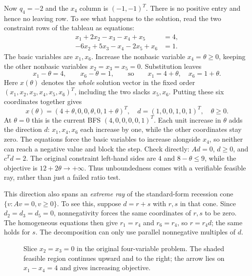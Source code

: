\documentclass[11pt,a4paper]{article}
\begin{document}
Now $q_4=-2$ and the $x_4$ column is $(-1,-1)^T$. There is no positive
entry and hence no leaving row. To see what happens to the solution, read
the two constraint rows of the tableau as equations:
\[
  \begin{aligned}
    x_1+2x_2-x_3-x_4+x_5&=4,\\
    -6x_2+5x_3-x_4-2x_5+x_6&=1.
  \end{aligned}
\]
The basic variables are $x_1,x_6$. Increase the nonbasic variable
$x_4=\theta\geq0$, keeping the other nonbasic variables $x_2=x_3=x_5=0$.
Substitution leaves
\[
  x_1-\theta=4,\qquad x_6-\theta=1,
  \qquad\text{so}\qquad x_1=4+\theta,\quad x_6=1+\theta.
\]
Here $x(\theta)$ denotes the \emph{whole} solution vector in the fixed order
$(x_1,x_2,x_3,x_4,x_5,x_6)^T$, including the two slacks $x_5,x_6$.
Putting these six coordinates together gives
\begin{equation}\label{eq:unbounded-ray}
  x(\theta)=(4+\theta,0,0,\theta,0,1+\theta)^T,
  \quad d=(1,0,0,1,0,1)^T,\quad \theta\geq0.
\end{equation}
At $\theta=0$ this is the current BFS $(4,0,0,0,0,1)^T$. Each unit increase
in $\theta$ adds the direction $d$: $x_1,x_4,x_6$ each increase by one,
while the other coordinates stay zero. The equations force the basic
variables to increase alongside $x_4$, so neither can reach a negative value
and block the step.
Check directly: $Ad=0$, $d\geq0$, and $c^Td=2$. The original constraint
left-hand sides are $4$ and $8-\theta\leq9$, while the objective is
$12+2\theta\to+\infty$. Thus unboundedness comes with a verifiable feasible
ray, rather than just a failed ratio test.

This direction also spans an \emph{extreme ray} of the standard-form recession
cone $\{v:Av=0,v\geq0\}$. To see this, suppose $d=r+s$ with $r,s$ in that
cone. Since $d_2=d_3=d_5=0$, nonnegativity forces the same coordinates of
$r,s$ to be zero. The homogeneous equations then give $r_1=r_4$ and
$r_6=r_4$, so $r=r_4d$; the same holds for $s$. The decomposition can only
use parallel nonnegative multiples of $d$.

\begin{figure}[H]
  \centering
  \caption{Slice $x_2=x_3=0$ in the original four-variable problem. The shaded
    feasible region continues upward and to the right; the arrow lies on
    $x_1-x_4=4$ and gives increasing objective.}
  \label{fig:unbounded-ray}
\end{figure}
\end{document}
